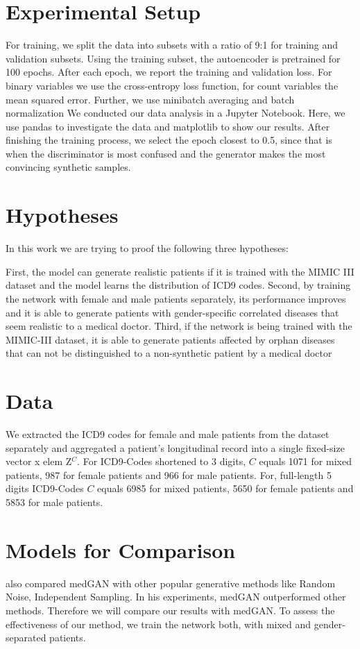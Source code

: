 \documentclass[11pt, a4paper]{book}
\begin{document}
\section{Experimental Setup}
 For training, we split the data into subsets with a ratio of 9:1 for training and validation subsets. Using the training subset, the autoencoder is pretrained for 100 epochs. 
 After each epoch, we report the training and validation loss. For binary variables we use the cross-entropy loss  function, for count variables the mean squared error.
 Further, we use minibatch averaging and batch normalization
We conducted our data analysis in a Jupyter Notebook. Here, we use pandas to investigate the data and matplotlib to show our results.
After finishing the training process, we select the epoch closest to 0.5, since that is when the discriminator is most confused and the generator makes the most convincing synthetic samples.


\section{Hypotheses}
In this work we are trying to proof the following three hypotheses:

First, the model can generate realistic patients if it is trained with the MIMIC III dataset and the model learns the distribution of ICD9 codes.
Second, by training the network with female and male patients separately, its performance improves and it is able to generate patients with gender-specific correlated diseases that seem realistic to a medical doctor.
Third, if the network is being trained with the MIMIC-III dataset, it is able to generate patients affected by orphan diseases that can not be distinguished to a non-synthetic patient by a medical doctor



\section{Data}
We extracted the ICD9 codes for female and male patients from the dataset separately and aggregated a patient’s longitudinal record into a single fixed-size vector  x elem Z{$^C$}. For ICD9-Codes shortened to 3 digits, $C$ equals 1071 for mixed patients, 987 for female patients and 966 for male patients. For, full-length 5 digits ICD9-Codes $C$ equals 6985 for mixed patients, 5650 for female patients and 5853 for male patients.

\section{Models for Comparison}
\cite{Choi2017} also compared medGAN with other popular generative methods like Random Noise, Independent Sampling. In his experiments, medGAN outperformed other methods. Therefore we will compare our results with medGAN. To assess the effectiveness of our method, we train the network both, with mixed and gender-separated patients. 
\end{document}
